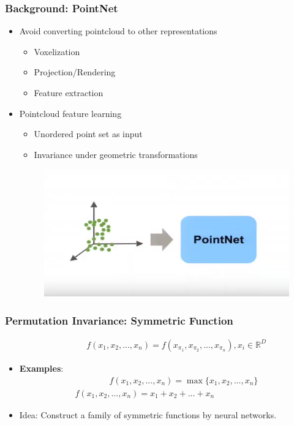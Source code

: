 \documentclass[10pt,fleqn,unknownkeysallowed]{beamer}
\begin{document}
\begin{frame}
	\frametitle{Background: PointNet}
	\linespread{1.5}
	\begin{itemize}
		\item{Avoid converting pointcloud to other representations}
		\begin{itemize}
		    \item Voxelization
		    \item Projection/Rendering
		    \item Feature extraction
		\end{itemize}
		\item{Pointcloud feature learning}
		\begin{itemize}
	        \item Unordered point set as input
	        \item Invariance under geometric transformations 
		\end{itemize}
	\begin{figure}
		\includegraphics[width=0.5\linewidth]{images/pointnet/pointNet} \\
	\end{figure}
	\end{itemize}
\end{frame}

\begin{frame}
\frametitle{Permutation Invariance: Symmetric Function}
\linespread{1.5}
	\begin{center}
    \begin{align*}
    	\quad \quad \quad \quad
        f(x_1,x_2,...,x_n) = f(x_{\pi_1},x_{\pi_2},...,x_{\pi_n}), x_i \in \mathbb{R}^D
    \end{align*}
    \end{center}
    \begin{itemize}
        \item \textbf{Examples}:
             \begin{align*}
             	\quad \quad \quad \quad
               f(x_1,x_2,...,x_n) = \max \{x_1,x_2,...,x_n\} \\
               f(x_1,x_2,...,x_n) = x_1 + x_2 + ... +x_n
            \end{align*}
            \item Idea: Construct a family of symmetric functions by neural networks.
    \end{itemize}
\end{frame}
\end{document}
